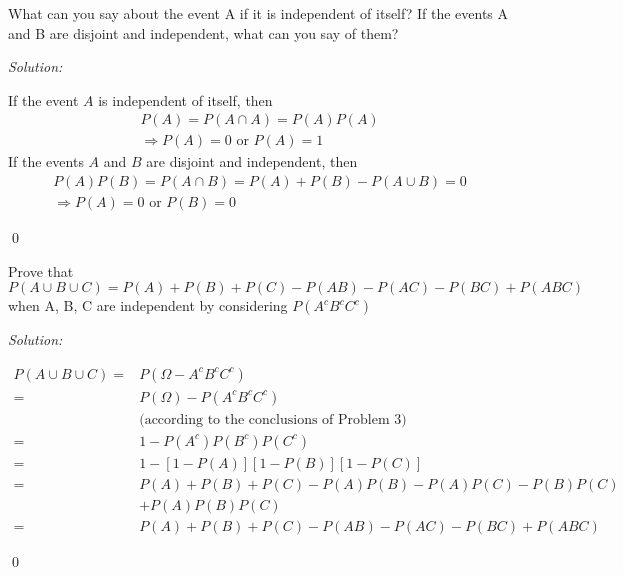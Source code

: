 \documentclass[12pt]{article}
\newenvironment{problem}[2][Problem]{\begin{trivlist}
\item[\hskip \labelsep {\bfseries #1}\hskip \labelsep {\bfseries #2.}]}{\end{trivlist}}
\newenvironment{sol}
    {\emph{Solution:}
    }
    {
    \qed
    }
\begin{document}
\begin{problem}{7}
What can you say about the event A if it is independent of itself? If
the events A and B are disjoint and independent, what can you say of
them?
\end{problem}
\begin{sol}
If the event $A$ is independent of itself, then
\begin{gather*}
P(A)=P(A\cap A)=P(A)P(A)\\
\Longrightarrow P(A)=0\text{ or }P(A)=1
\end{gather*}
If the events $A$ and $B$ are disjoint and independent, then
\begin{gather*}
P(A)P(B)=P(A\cap B)=P(A)+P(B)-P(A\cup B)=0\\
\Longrightarrow P(A)=0\text{ or }P(B)=0
\end{gather*}
\end{sol}

\begin{problem}{8}
Prove that $$P(A\cup B\cup C) = P(A) + P(B) + P(C) - P(AB) - P(AC) - P(BC) + P(ABC)$$
when A, B, C are independent by considering $P(A^{c}B^{c}C^{c})$
\end{problem}
\begin{sol}
\begin{align*}
P(A\cup B\cup C)=&P(\Omega-A^cB^cC^c)\\
=&P(\Omega)-P(A^cB^cC^c)\\
&\text{(according to the conclusions of Problem 3)}\\
=&1-P(A^c)P(B^c)P(C^c)\\
=&1-[1-P(A)][1-P(B)][1-P(C)]\\
=&P(A)+P(B)+P(C)-P(A)P(B)-P(A)P(C)-P(B)P(C)\\
&+P(A)P(B)P(C)\\
=&P(A)+P(B)+P(C)-P(AB)-P(AC)-P(BC)+P(ABC)
\end{align*}
\end{sol}
\end{document}
